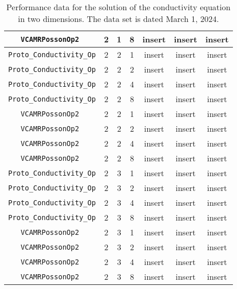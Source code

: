\documentclass{article}
\begin{document}
\begin{small}
\begin{table}
\begin{center}
\begin{tabular}{|c|c|c|c|c|c||c|}
 {\tt VCAMRPossonOp2 }         & 2 & 1   & 8    &  insert  &  insert    & insert    \\
\hline                                                                                
 {\tt Proto\_Conductivity\_Op} & 2 & 2   & 1    &  insert  &  insert    & insert    \\
 {\tt Proto\_Conductivity\_Op} & 2 & 2   & 2    &  insert  &  insert    & insert    \\
 {\tt Proto\_Conductivity\_Op} & 2 & 2   & 4    &  insert  &  insert    & insert    \\
 {\tt Proto\_Conductivity\_Op} & 2 & 2   & 8    &  insert  &  insert    & insert    \\
\hline                                                                                
 {\tt VCAMRPossonOp2         } & 2 & 2   & 1    &  insert  &  insert    & insert   \\
 {\tt VCAMRPossonOp2         } & 2 & 2   & 2    &  insert  &  insert    & insert   \\
 {\tt VCAMRPossonOp2         } & 2 & 2   & 4    &  insert  &  insert    & insert   \\
 {\tt VCAMRPossonOp2         } & 2 & 2   & 8    &  insert  &  insert    & insert   \\
 \hline                                                                               
                                                                                      
 {\tt Proto\_Conductivity\_Op} & 2 & 3   & 1    &  insert  &  insert    & insert    \\
 {\tt Proto\_Conductivity\_Op} & 2 & 3   & 2    &  insert  &  insert    & insert    \\
 {\tt Proto\_Conductivity\_Op} & 2 & 3   & 4    &  insert  &  insert    & insert    \\
 {\tt Proto\_Conductivity\_Op} & 2 & 3   & 8    &  insert  &  insert    & insert    \\
\hline                                                                                
 {\tt VCAMRPossonOp2         } & 2 & 3   & 1    &  insert  &  insert    & insert   \\
 {\tt VCAMRPossonOp2         } & 2 & 3   & 2    &  insert  &  insert    & insert   \\
 {\tt VCAMRPossonOp2         } & 2 & 3   & 4    &  insert  &  insert    & insert   \\
 {\tt VCAMRPossonOp2         } & 2 & 3   & 8    &  insert  &  insert    & insert   \\
 \hline
\end{tabular}
\end{center}
\label{tab::conductivity_2d}
\caption
    {
      Performance data for the solution of the conductivity
      equation in two dimensions.
      The data set is dated March 1, 2024.
    }
\end{table}
\end{small}
\end{document}
